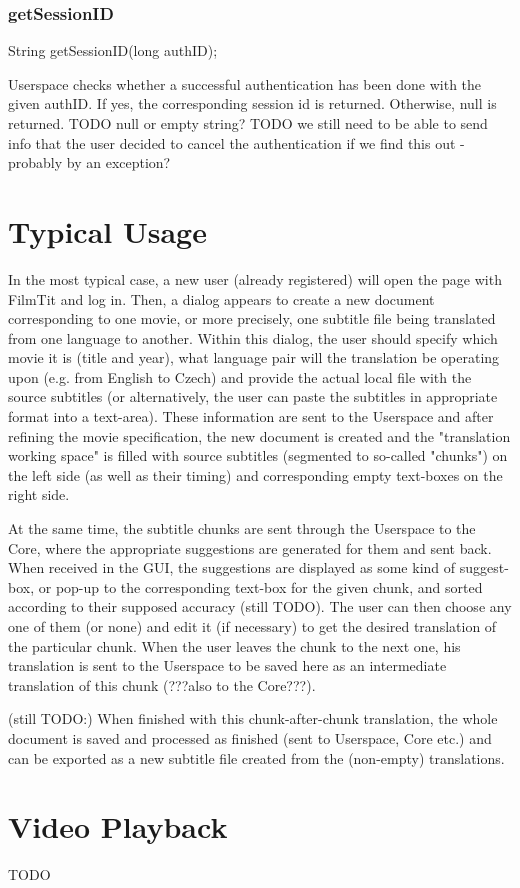 \subsubsection{getSessionID}
    String getSessionID(long authID);

Userspace checks whether a successful authentication has been done with the given authID.
If yes, the corresponding session id is returned.
Otherwise, null is returned.
TODO null or empty string?
TODO we still need to be able to send info that the user decided to cancel the authentication if we find this out - probably by an exception?



\section{Typical Usage}
In the most typical case, a new user (already registered) will open the page with FilmTit and log in. Then, a dialog appears to create a new document corresponding to one movie, or more precisely, one subtitle file being translated from one language to another. Within this dialog, the user should specify which movie it is (title and year), what language pair will the translation be operating upon (e.g. from English to Czech) and provide the actual local file with the source subtitles (or alternatively, the user can paste the subtitles in appropriate format into a text-area). These information are sent to the Userspace and after refining the movie specification, the new document is created and the "translation working space" is filled with source subtitles (segmented to so-called "chunks") on the left side (as well as their timing) and corresponding empty text-boxes on the right side.

At the same time, the subtitle chunks are sent through the Userspace to the Core, where the appropriate suggestions are generated for them and sent back. When received in the GUI, the suggestions are displayed as some kind of suggest-box, or pop-up to the corresponding text-box for the given chunk, and sorted according to their supposed accuracy (still TODO). The user can then choose any one of them (or none) and edit it (if necessary) to get the desired translation of the particular chunk. When the user leaves the chunk to the next one, his translation is sent to the Userspace to be saved here as an intermediate translation of this chunk (???also to the Core???).

(still TODO:)
When finished with this chunk-after-chunk translation, the whole document is saved and processed as finished (sent to Userspace, Core etc.) and can be exported as a new subtitle file created from the (non-empty) translations.

\section{Video Playback}

TODO 
